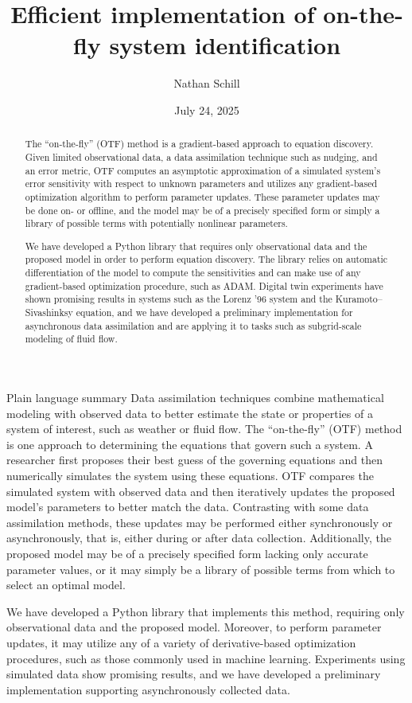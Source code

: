 \documentclass[12pt]{article}
\title{Efficient implementation of on-the-fly system identification}
\author{Nathan Schill}
\date{July 24, 2025}
\begin{document}
\maketitle

\begin{abstract}
  The ``on-the-fly'' (OTF) method is a gradient-based approach to equation discovery.
  Given limited observational data, a data assimilation technique such as nudging, and an error metric, OTF computes an asymptotic approximation of a simulated system's error sensitivity with respect to unknown parameters and utilizes any gradient-based optimization algorithm to perform parameter updates.
  These parameter updates may be done on- or offline, and the model may be of a precisely specified form or simply a library of possible terms with potentially nonlinear parameters.

  We have developed a Python library that requires only observational data and the proposed model in order to perform equation discovery.
  The library relies on automatic differentiation of the model to compute the sensitivities and can make use of any gradient-based optimization procedure, such as ADAM.
  Digital twin experiments have shown promising results in systems such as the Lorenz '96 system and the Kuramoto--Sivashinksy equation, and we have developed a preliminary implementation for asynchronous data assimilation and are applying it to tasks such as subgrid-scale modeling of fluid flow.
\end{abstract}

\begin{section}{Plain language summary}
  Data assimilation techniques combine mathematical modeling with observed data to better estimate the state or properties of a system of interest, such as weather or fluid flow.
  The ``on-the-fly'' (OTF) method is one approach to determining the equations that govern such a system.
  A researcher first proposes their best guess of the governing equations and then numerically simulates the system using these equations.
  OTF compares the simulated system with observed data and then iteratively updates the proposed model's parameters to better match the data.
  Contrasting with some data assimilation methods, these updates may be performed either synchronously or asynchronously, that is, either during or after data collection.
  Additionally, the proposed model may be of a precisely specified form lacking only accurate parameter values, or it may simply be a library of possible terms from which to select an optimal model.

  We have developed a Python library that implements this method, requiring only observational data and the proposed model.
  Moreover, to perform parameter updates, it may utilize any of a variety of derivative-based optimization procedures, such as those commonly used in machine learning.
  Experiments using simulated data show promising results, and we have developed a preliminary implementation supporting asynchronously collected data.
\end{section}
\end{document}
